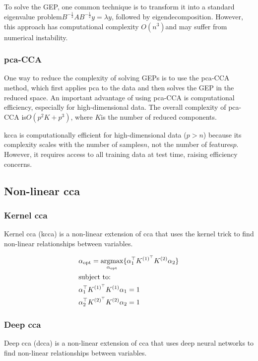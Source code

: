 To solve the GEP, one common technique is to transform it into a standard eigenvalue problem\( B^{-\frac{1}{2}} A B^{-\frac{1}{2}} y = \lambda y \), followed by eigendecomposition.
However, this approach has computational complexity \(O(n^3)\)and may suffer from numerical instability.

\subsubsection{\acrshort{pca}-CCA}

One way to reduce the complexity of solving GEPs is to use the \acrshort{pca}-CCA method, which first applies \acrshort{pca} to the data
and then solves the GEP in the reduced space.
An important advantage of using \acrshort{pca}-CCA is computational efficiency, especially for high-dimensional data.
The overall complexity of \acrshort{pca}-CCA is\(O(p^2K + p^3)\), where \( K \)is the number of reduced components.

\acrshort{kcca} is computationally efficient for high-dimensional data (\(p>n\)) because its complexity scales with the number of samples\(n\), not the number of features\(p\).
However, it requires access to all training data at test time, raising efficiency concerns.

\subsection{Non-linear \acrshort{cca}}

\subsubsection{Kernel \acrshort{cca}}

Kernel \acrshort{cca} (\acrshort{kcca}) is a non-linear extension of \acrshort{cca} that uses the kernel trick to find non-linear relationships between variables.

\begin{align}
     & \alpha_{\text{opt}}=\underset{\alpha_{\text{opt}}}{\mathrm{argmax}}\{ \alpha_1^{\top}K^{(1)^{\top}}K^{(2)}\alpha_2  \} \\
     & \text{subject to:} \notag                                                                                            \\
     & \alpha_1^{\top}K^{(1)^{\top}}K^{(1)}\alpha_1=1 \notag                                                                  \\
     & \alpha_2^{\top}K^{(2)^{\top}}K^{(2)}\alpha_2=1 \notag
\end{align}

\subsubsection{Deep \acrshort{cca}}

Deep \acrshort{cca} (\acrshort{dcca}) is a non-linear extension of \acrshort{cca} that uses deep neural networks to find non-linear relationships between variables.





